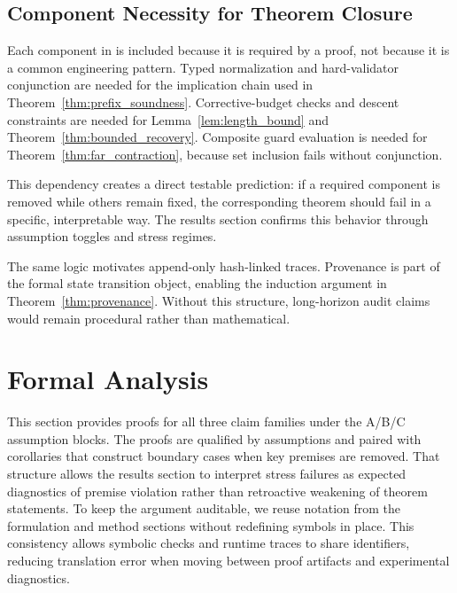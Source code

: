 \documentclass{article} %
\begin{document}
\subsection{Component Necessity for Theorem Closure}
Each component in  is included because it is required by a proof, not because it is a common engineering pattern. Typed normalization and hard-validator conjunction are needed for the implication chain used in Theorem~\ref{thm:prefix_soundness}. Corrective-budget checks and descent constraints are needed for Lemma~\ref{lem:length_bound} and Theorem~\ref{thm:bounded_recovery}. Composite guard evaluation is needed for Theorem~\ref{thm:far_contraction}, because set inclusion fails without conjunction.

This dependency creates a direct testable prediction: if a required component is removed while others remain fixed, the corresponding theorem should fail in a specific, interpretable way. The results section confirms this behavior through assumption toggles and stress regimes.

The same logic motivates append-only hash-linked traces. Provenance is part of the formal state transition object, enabling the induction argument in Theorem~\ref{thm:provenance}. Without this structure, long-horizon audit claims would remain procedural rather than mathematical.

\section{Formal Analysis}
\label{sec:formal}
This section provides proofs for all three claim families under the A/B/C assumption blocks. The proofs are qualified by assumptions and paired with corollaries that construct boundary cases when key premises are removed. That structure allows the results section to interpret stress failures as expected diagnostics of premise violation rather than retroactive weakening of theorem statements.
To keep the argument auditable, we reuse notation from the formulation and method sections without redefining symbols in place. This consistency allows symbolic checks and runtime traces to share identifiers, reducing translation error when moving between proof artifacts and experimental diagnostics.
\end{document}
